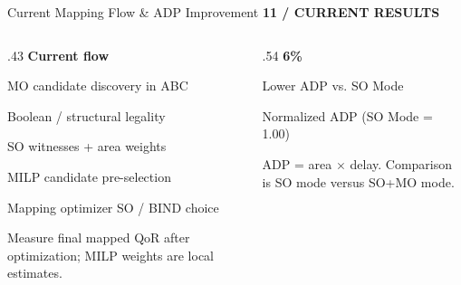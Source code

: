 \documentclass[aspectratio=169,10pt]{beamer}
\newcommand{\smalllabel}[1]{{\scriptsize\bfseries\color{Accent}\MakeUppercase{#1}}}
\begin{document}
\begin{frame}{Current Mapping Flow \& ADP Improvement}
  \smalllabel{11 / Current Results}\par\vspace{.10cm}
  \begin{columns}[T,onlytextwidth]
    \begin{column}{.43\textwidth}
      {\large\bfseries\color{Accent}Current flow}\par\vspace{.18cm}
      {\normalsize
      MO candidate discovery in ABC\par\vspace{.14cm}
      Boolean / structural legality\par\vspace{.14cm}
      SO witnesses + area weights\par\vspace{.14cm}
      MILP candidate pre-selection\par\vspace{.14cm}
      Mapping optimizer SO / BIND choice\par}
      \vspace{.24cm}
      {\small Measure final mapped QoR after optimization; MILP weights are local estimates.}
    \end{column}
    \begin{column}{.54\textwidth}
      {\fontsize{32}{36}\selectfont\bfseries\color{Accent}6\%}\par
      {\small Lower ADP vs. SO Mode}\par\vspace{.16cm}
      {\scriptsize\color{Muted}Normalized ADP (SO Mode = 1.00)}\par\vspace{.20cm}
      \par
      \vspace{.15cm}
      {\scriptsize ADP = area $\times$ delay. Comparison is SO mode versus SO+MO mode.}
    \end{column}
  \end{columns}
\end{frame}
\end{document}
